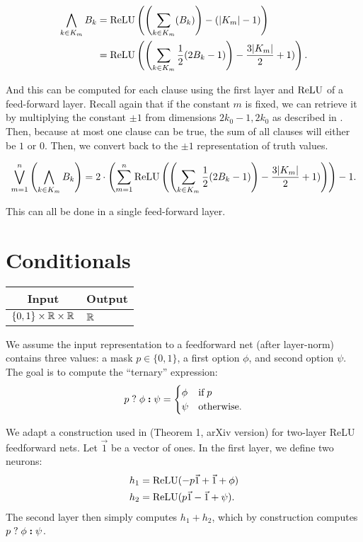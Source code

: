     \begin{align*}
    \bigwedge_{k\in K_m} B_k &= \text{ReLU}\left(\left(\sum_{k\in K_m} (B_k)\right) -(|K_m|-1)\right) \\ &=\text{ReLU}\left(\left(\sum_{k\in K_m} \frac{1}{2}(2B_k-1) \right) - \frac{3|K_m|}{2}+1)\right).
    \end{align*}
    
    And this can be computed for each clause using the first layer and $\text{ReLU}$ of a feed-forward layer. Recall again that if the constant $m$ is fixed, we can retrieve it by multiplying the constant $\pm 1$ from dimensions $2k_0-1,2k_0$ as described in . Then, because at most one clause can be true, the sum of all clauses will either be $1$ or $0$. Then, we convert back to the $\pm1$ representation of truth values. 

    \[\bigvee_{m=1}^n \left(\bigwedge_{k\in K_m} B_k \right)=2\cdot\left(\sum_{m=1}^n\text{ReLU}\left(\left(\sum_{k\in K_m} \frac{1}{2}(2B_k-1) \right) - \frac{3|K_m|}{2}+1)\right)\right)-1.\]

    This can all be done in a single feed-forward layer.



\section{Conditionals}

    \begin{tabular}{|c|p{1.5cm}|}
        \hline
        \rowcolor{orange!20} %
        \textbf{Input} & \textbf{Output} \\
        \hline
        $\{0,1\}\times \mathbb{R}\times\mathbb{R}$ & $\mathbb{R}$ \\
        \hline
    \end{tabular}


We assume the input representation to a feedforward net (after layer-norm) contains three values: a mask $p \in \{0, 1\}$, a first option $\phi$, and second option $\psi$. The goal is to compute the ``ternary'' expression:
\begin{equation*}
    p\;\mathbf{?}\; \phi\; \textbf{:} \;\psi =
    \begin{cases}
        \phi & \textrm{if} \; p \\
        \psi & \textrm{otherwise.}
    \end{cases}
\end{equation*}

We adapt a construction used in \citep{merrill2024the} (Theorem 1, arXiv version) for two-layer ReLU feedforward nets.
Let $\vec 1$ be a vector of ones.
In the first layer, we define two neurons:
\begin{align*}
    h_1 &= \text{ReLU}(-p \vec 1 + \vec 1 + \phi) \\
    h_2 &= \text{ReLU}(p \vec 1 - \vec 1 + \psi) .
\end{align*}
The second layer then simply computes $h_1 + h_2$, which by construction computes $p\;\mathbf{?}\; \phi\; \textbf{:} \;\psi$.


